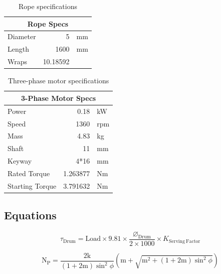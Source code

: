 \begin{table}[H]
  \centering
  \caption{Rope specifications}
  \begin{tabular}{|l|r|l|}
    \hline
    \multicolumn{3}{|c|}{\textbf{Rope Specs}} \\
    \hline
    Diameter & 5 & mm \\
    Length & 1600 & mm \\
    Wraps & 10.18592 & \\
    \hline
  \end{tabular}
  \label{tab:rope_specs}
\end{table}

\begin{table}[H]
  \centering
  \caption{Three-phase motor specifications}
  \begin{tabular}{|l|r|l|}
    \hline
    \multicolumn{3}{|c|}{\textbf{3-Phase Motor Specs}} \\
    \hline
    Power & 0.18 & kW \\
    Speed & 1360 & rpm \\
    Mass & 4.83 & kg \\
    Shaft & 11 & mm \\
    Keyway & 4*16 & mm \\
    Rated Torque & 1.263877 & Nm \\
    Starting Torque & 3.791632 & Nm \\
    \hline
  \end{tabular}
  \label{tab:motor_specs}
\end{table}

\subsection{Equations}
\label{subsec:c-equations}

\begin{equation}
\label{eq:drum_torque}
\tau_{\mathrm{Drum}} = \mathrm{Load} \times 9.81 \times \frac{\varnothing_{\mathrm{Drum}}}{2 \times 1000} \times K_{\mathrm{Serving\ Factor}}
\end{equation}

\begin{equation}
\label{eq:min_gear}
\mathrm{N_P} = \frac{2\mathrm{k}}{(1 + 2\mathrm{m})\sin^2 \phi} \left( \mathrm{m} + \sqrt{\mathrm{m}^2 + (1 + 2\mathrm{m})\sin^2 \phi} \right)\end{equation}

